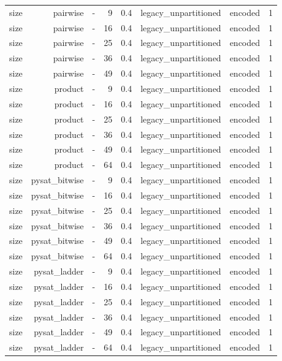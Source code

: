 \begin{tabular}{lrrrrrrr}
size & pairwise & - & 9 & 0.4 & legacy\_unpartitioned & encoded & 1 \\
size & pairwise & - & 16 & 0.4 & legacy\_unpartitioned & encoded & 1 \\
size & pairwise & - & 25 & 0.4 & legacy\_unpartitioned & encoded & 1 \\
size & pairwise & - & 36 & 0.4 & legacy\_unpartitioned & encoded & 1 \\
size & pairwise & - & 49 & 0.4 & legacy\_unpartitioned & encoded & 1 \\
size & product & - & 9 & 0.4 & legacy\_unpartitioned & encoded & 1 \\
size & product & - & 16 & 0.4 & legacy\_unpartitioned & encoded & 1 \\
size & product & - & 25 & 0.4 & legacy\_unpartitioned & encoded & 1 \\
size & product & - & 36 & 0.4 & legacy\_unpartitioned & encoded & 1 \\
size & product & - & 49 & 0.4 & legacy\_unpartitioned & encoded & 1 \\
size & product & - & 64 & 0.4 & legacy\_unpartitioned & encoded & 1 \\
size & pysat\_bitwise & - & 9 & 0.4 & legacy\_unpartitioned & encoded & 1 \\
size & pysat\_bitwise & - & 16 & 0.4 & legacy\_unpartitioned & encoded & 1 \\
size & pysat\_bitwise & - & 25 & 0.4 & legacy\_unpartitioned & encoded & 1 \\
size & pysat\_bitwise & - & 36 & 0.4 & legacy\_unpartitioned & encoded & 1 \\
size & pysat\_bitwise & - & 49 & 0.4 & legacy\_unpartitioned & encoded & 1 \\
size & pysat\_bitwise & - & 64 & 0.4 & legacy\_unpartitioned & encoded & 1 \\
size & pysat\_ladder & - & 9 & 0.4 & legacy\_unpartitioned & encoded & 1 \\
size & pysat\_ladder & - & 16 & 0.4 & legacy\_unpartitioned & encoded & 1 \\
size & pysat\_ladder & - & 25 & 0.4 & legacy\_unpartitioned & encoded & 1 \\
size & pysat\_ladder & - & 36 & 0.4 & legacy\_unpartitioned & encoded & 1 \\
size & pysat\_ladder & - & 49 & 0.4 & legacy\_unpartitioned & encoded & 1 \\
size & pysat\_ladder & - & 64 & 0.4 & legacy\_unpartitioned & encoded & 1 \\

\end{tabular}

